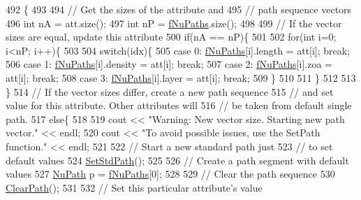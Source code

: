 \begin{DoxyCode}
492                                                     \{
493 
494   \textcolor{comment}{// Get the sizes of the attribute and}
495   \textcolor{comment}{// path sequence vectors}
496   \textcolor{keywordtype}{int} nA = att.size();
497   \textcolor{keywordtype}{int} nP = \hyperlink{classOscProb_1_1PMNS__Base_a69db9d57e12fc7cbe0431bc6c18fac93}{fNuPaths}.size();
498 
499   \textcolor{comment}{// If the vector sizes are equal, update this attribute}
500   \textcolor{keywordflow}{if}(nA == nP)\{
501 
502     \textcolor{keywordflow}{for}(\textcolor{keywordtype}{int} i=0; i<nP; i++)\{
503 
504       \textcolor{keywordflow}{switch}(idx)\{
505         \textcolor{keywordflow}{case} 0: \hyperlink{classOscProb_1_1PMNS__Base_a69db9d57e12fc7cbe0431bc6c18fac93}{fNuPaths}[i].length  = att[i]; \textcolor{keywordflow}{break};
506         \textcolor{keywordflow}{case} 1: \hyperlink{classOscProb_1_1PMNS__Base_a69db9d57e12fc7cbe0431bc6c18fac93}{fNuPaths}[i].density = att[i]; \textcolor{keywordflow}{break};
507         \textcolor{keywordflow}{case} 2: \hyperlink{classOscProb_1_1PMNS__Base_a69db9d57e12fc7cbe0431bc6c18fac93}{fNuPaths}[i].zoa     = att[i]; \textcolor{keywordflow}{break};
508         \textcolor{keywordflow}{case} 3: \hyperlink{classOscProb_1_1PMNS__Base_a69db9d57e12fc7cbe0431bc6c18fac93}{fNuPaths}[i].layer   = att[i]; \textcolor{keywordflow}{break};
509       \}
510 
511     \}
512 
513   \}
514   \textcolor{comment}{// If the vector sizes differ, create a new path sequence}
515   \textcolor{comment}{// and set value for this attribute. Other attributes will}
516   \textcolor{comment}{// be taken from default single path.}
517   \textcolor{keywordflow}{else}\{
518 
519     cout << \textcolor{stringliteral}{"Warning: New vector size. Starting new path vector."} << endl;
520     cout << \textcolor{stringliteral}{"To avoid possible issues, use the SetPath function."} << endl;
521 
522     \textcolor{comment}{// Start a new standard path just}
523     \textcolor{comment}{// to set default values}
524     \hyperlink{classOscProb_1_1PMNS__Base_add6533a9fc9acdfc7ae258b62570d78d}{SetStdPath}();
525 
526     \textcolor{comment}{// Create a path segment with default values}
527     \hyperlink{structOscProb_1_1NuPath}{NuPath} p = \hyperlink{classOscProb_1_1PMNS__Base_a69db9d57e12fc7cbe0431bc6c18fac93}{fNuPaths}[0];
528 
529     \textcolor{comment}{// Clear the path sequence}
530     \hyperlink{classOscProb_1_1PMNS__Base_aefe521239031c418cfaaaa550a6e13bb}{ClearPath}();
531 
532     \textcolor{comment}{// Set this particular attribute's value}

\end{DoxyCode}
